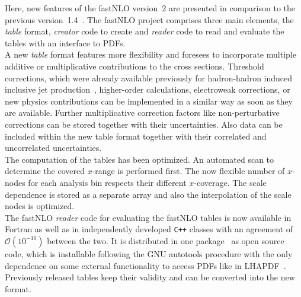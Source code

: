 \documentclass{DISproc}
\begin{document}
Here, new features of the fastNLO version~2 are presented in
comparison to the previous version~1.4~\cite{Kluge:2006xs}.
The fastNLO project comprises three main elements, the \emph{table}
format, \emph{creator} code to create and \emph{reader} code to read
and evaluate the tables with an interface to PDFs.\\
A new \emph{table} format features more flexibility and foresees to
incorporate multiple additive or multiplicative contributions to the
cross sections.  Threshold corrections, which were already available
previously for hadron-hadron induced inclusive jet
production~\cite{Kidonakis:2000gi}, higher-order calculations,
electroweak corrections, or new physics contributions can be
implemented in a similar way as soon as they are available.  Further
multiplicative correction factors like non-perturbative corrections
can be stored together with their uncertainties.
Also data can be included within the new table format together with
their correlated and uncorrelated uncertainties.\\
The computation of the tables has been optimized.  An automated scan
to determine the covered $x$-range is performed first.  The now
flexible number of $x$-nodes for each analysis bin respects their
different $x$-coverage.
The scale dependence is stored as a separate array and also the
interpolation of the scale nodes is optimized.\\
The fastNLO \emph{reader} code for evaluating the fastNLO tables is
now available in Fortran as well as in independently developed
\texttt{C++} classes with an agreement of $\mathcal{O}(10^{-10})$
between the two.  It is distributed in one
package~\cite{Fnlo:2012:Online} as open source code, which is
installable following the GNU autotools procedure with the only
dependence on some external functionality to access PDFs like in
LHAPDF~\cite{Whalley:2005nh}.  Previously released tables keep their
validity and can be converted into the new format.



\end{document}
